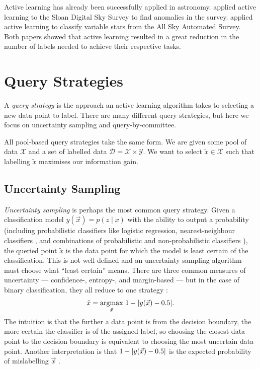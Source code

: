     Active learning has already been successfully applied in astronomy.
    \citet{pelleg04} applied active learning to the Sloan Digital Sky Survey to
    find anomalies in the survey. \citet{richards12} applied active learning to
    classify variable stars from the All Sky Automated Survey. Both papers
    showed that active learning resulted in a great reduction in the number of
    labels needed to achieve their respective tasks.

\section{Query Strategies}
\label{sec:query-strategies}

    A \emph{query strategy} is the approach an active learning algorithm takes
    to selecting a new data point to label. There are many different query
    strategies, but here we focus on uncertainty sampling and
    query-by-committee.

    All pool-based query strategies take the same form. We are given some pool
    of data $\mathcal X$ and a set of labelled data $\mathcal D = \mathcal X
    \times \mathcal Y$. We want to select $\tilde x \in \mathcal X$ such that
    labelling $\tilde x$ maximises our information gain.

    \subsection{Uncertainty Sampling}
    \label{sec:uncertainty-sampling}

        \emph{Uncertainty sampling} \citep{lewis94} is perhaps the most common
        query strategy. Given a classification model $y(\vec x) = p(z \mid x)$
        with the ability to output a probability (including probabilistic
        classifiers like logistic regression, nearest-neighbour classifiers
        \citep{lewis94}, and combinations of probabilistic and non-probabilistic
        classifiers \citep{lewis94b}), the queried point $\tilde x$ is the data
        point for which the model is least certain of the classification. This
        is not well-defined and an uncertainty sampling algorithm must choose
        what ``least certain'' means. There are three common measures of
        uncertainty --- confidence-, entropy-, and margin-based --- but in the
        case of binary classification, they all reduce to one strategy
        \citep{settles09}:
        \[
            \tilde x = \underset{\vec x}{\mbox{argmax}}\ 1 - |y(\vec x) - 0.5|.
        \]
        The intuition is that the further a data point is from the decision
        boundary, the more certain the classifier is of the assigned label, so
        choosing the closest data point to the decision boundary is equivalent
        to choosing the most uncertain data point. Another interpretation is that $1 - |y(\vec x) - 0.5|$ is the expected probability of mislabelling $\vec x$ \citep{settles09}.

